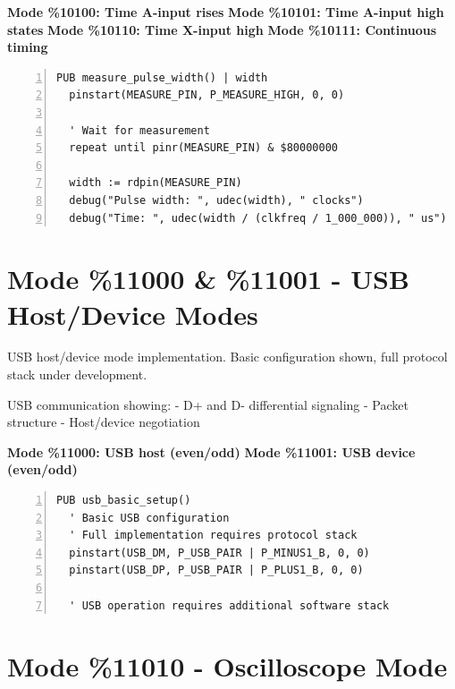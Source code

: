 \documentclass[11pt,a4paper,oneside,english]{book}
\begin{document}
\textbf{Mode \%10100: Time A-input rises} \textbf{Mode \%10101: Time
A-input high states} \textbf{Mode \%10110: Time X-input high}
\textbf{Mode \%10111: Continuous timing}

\begin{Spin2Block}
\begin{Verbatim}[numbers=left,numbersep=5pt,xleftmargin=15pt]
PUB measure_pulse_width() | width
  pinstart(MEASURE_PIN, P_MEASURE_HIGH, 0, 0)
  
  ' Wait for measurement
  repeat until pinr(MEASURE_PIN) & $80000000
  
  width := rdpin(MEASURE_PIN)
  debug("Pulse width: ", udec(width), " clocks")
  debug("Time: ", udec(width / (clkfreq / 1_000_000)), " us")
\end{Verbatim}
\end{Spin2Block}

\clearpage

\hypertarget{mode-11000-11001---usb-hostdevice-modes}{%
\section{Mode \%11000 \& \%11001 - USB Host/Device
Modes}\label{mode-11000-11001---usb-hostdevice-modes}}

USB host/device mode implementation. Basic configuration shown, full
protocol stack under development.

USB communication showing: - D+ and D- differential signaling - Packet
structure - Host/device negotiation

\textbf{Mode \%11000: USB host (even/odd)} \textbf{Mode \%11001: USB
device (even/odd)}

\begin{Spin2Block}
\begin{Verbatim}[numbers=left,numbersep=5pt,xleftmargin=15pt]
PUB usb_basic_setup()
  ' Basic USB configuration
  ' Full implementation requires protocol stack
  pinstart(USB_DM, P_USB_PAIR | P_MINUS1_B, 0, 0)
  pinstart(USB_DP, P_USB_PAIR | P_PLUS1_B, 0, 0)
  
  ' USB operation requires additional software stack
\end{Verbatim}
\end{Spin2Block}

\clearpage

\hypertarget{mode-11010---oscilloscope-mode}{%
\section{Mode \%11010 - Oscilloscope
Mode}\label{mode-11010---oscilloscope-mode}}
\end{document}

